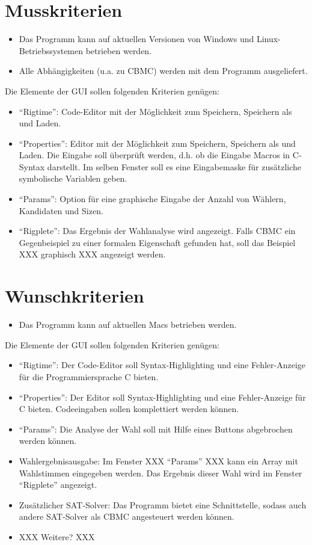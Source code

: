 \documentclass[a4paper]{scrreprt}
\begin{document}
\section{Musskriterien}
\begin{itemize}
\item Das Programm kann auf aktuellen Versionen von Windows und Linux-Betriebssystemen betrieben werden.
\item Alle Abhängigkeiten (u.a. zu CBMC) werden mit dem Programm ausgeliefert.
\end{itemize}
Die Elemente der GUI sollen folgenden Kriterien genügen:
\begin{itemize}
\item "`Rigtime"': Code-Editor mit der Möglichkeit zum Speichern, Speichern als und Laden.
\item "`Properties"': Editor mit der Möglichkeit zum Speichern, Speichern als und Laden. Die Eingabe soll überprüft werden, d.h. ob die Eingabe Macros in C-Syntax darstellt. Im selben Fenster soll es eine Eingabemaske für zusätzliche symbolische Variablen geben.
\item "`Params"': Option für eine graphische Eingabe der Anzahl von Wählern, Kandidaten und Sizen.
\item "`Rigplete"': Das Ergebnis der Wahlanalyse wird angezeigt. Falls CBMC ein Gegenbeispiel zu einer formalen Eigenschaft gefunden hat, soll das Beispiel XXX graphisch XXX angezeigt werden.
\end{itemize}

\section{Wunschkriterien}
\begin{itemize}
\item Das Programm kann auf aktuellen Macs betrieben werden.
\end{itemize}
Die Elemente der GUI sollen folgenden Kriterien genügen:
\begin{itemize}
\item "`Rigtime"': Der Code-Editor soll Syntax-Highlighting und eine Fehler-Anzeige für die Programmiersprache C bieten.
\item "`Properties"': Der Editor soll Syntax-Highlighting und eine Fehler-Anzeige für C bieten. Codeeingaben sollen komplettiert werden können.
\item "`Params"': Die Analyse der Wahl soll mit Hilfe eines Buttons abgebrochen werden können.
\item Wahlergebnisausgabe: Im Fenster XXX "`Params"' XXX kann ein Array mit Wahlstimmen eingegeben werden. Das Ergebnis dieser Wahl wird im Fenster "`Rigplete"' angezeigt.
\item Zusätzlicher SAT-Solver: Das Programm bietet eine Schnittstelle, sodass auch andere SAT-Solver als CBMC angesteuert werden können.
\item XXX Weitere? XXX
\end{itemize}
\end{document}
